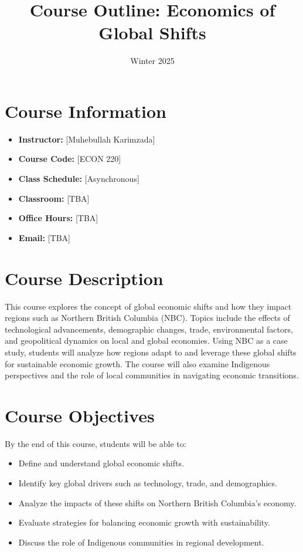 \documentclass{article}
\title{Course Outline: Economics of Global Shifts}
\author{}
\date{Winter 2025}
\begin{document}
\maketitle

\section*{Course Information}
\begin{itemize}
    \item \textbf{Instructor:} [Muhebullah Karimzada]
    \item \textbf{Course Code:} [ECON 220]
    \item \textbf{Class Schedule:} [Asynchronous]
    \item \textbf{Classroom:} [TBA]
    \item \textbf{Office Hours:} [TBA]
    \item \textbf{Email:} [TBA]
\end{itemize}

\section*{Course Description}
This course explores the concept of global economic shifts and how they impact regions such as Northern British Columbia (NBC). Topics include the effects of technological advancements, demographic changes, trade, environmental factors, and geopolitical dynamics on local and global economies. Using NBC as a case study, students will analyze how regions adapt to and leverage these global shifts for sustainable economic growth. The course will also examine Indigenous perspectives and the role of local communities in navigating economic transitions.

\section*{Course Objectives}
By the end of this course, students will be able to:
\begin{itemize}
    \item Define and understand global economic shifts.
    \item Identify key global drivers such as technology, trade, and demographics.
    \item Analyze the impacts of these shifts on Northern British Columbia's economy.
    \item Evaluate strategies for balancing economic growth with sustainability.
    \item Discuss the role of Indigenous communities in regional development.
\end{itemize}
\end{document}
